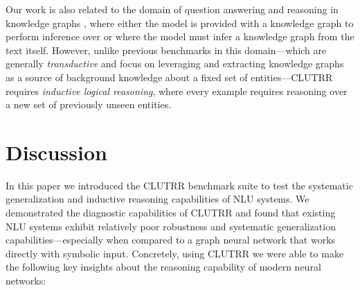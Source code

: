 \documentclass[letterpaper, 12pt]{report}
\begin{document}
Our work is also related to the domain of question answering and reasoning in knowledge graphs \citep{das2017go, xiong2018one, NIPS2018_7473, 8587330, xiong2017deeppath, welbl2018constructing, kartsaklis2018mapping}, where either the model is provided with a knowledge graph to perform inference over or where the model must infer a knowledge graph from the text itself.
However, unlike previous benchmarks in this domain---which are generally {\em transductive} and focus on leveraging and extracting knowledge graphs as a source of background knowledge about a fixed set of entities---CLUTRR requires {\em inductive logical reasoning}, where every example requires reasoning over a new set of previously unseen entities.


\section{Discussion}
\label{sec:clutrr_discussion}

In this paper we introduced the CLUTRR benchmark suite to test the systematic generalization and inductive reasoning capabilities of NLU systems.
We demonstrated the diagnostic capabilities of CLUTRR and found that existing NLU systems exhibit relatively poor robustness and systematic generalization capabilities---especially when compared to a graph neural network that works directly with symbolic input.
Concretely, using CLUTRR we were able to make the following key insights about the reasoning capability of modern neural networks:
\end{document}
